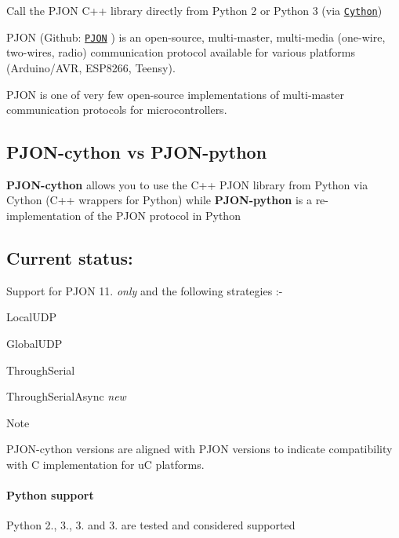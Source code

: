 Call the P\-J\-O\-N C++ library directly from Python 2 or Python 3 (via \href{http://cython.org/}{\tt Cython})

P\-J\-O\-N (Github\-: \href{https://github.com/gioblu/PJON/}{\tt P\-J\-O\-N} ) is an open-\/source, multi-\/master, multi-\/media (one-\/wire, two-\/wires, radio) communication protocol available for various platforms (Arduino/\-A\-V\-R, E\-S\-P8266, Teensy).

P\-J\-O\-N is one of very few open-\/source implementations of multi-\/master communication protocols for microcontrollers.

\subsection*{P\-J\-O\-N-\/cython vs P\-J\-O\-N-\/python}

{\bfseries P\-J\-O\-N-\/cython} allows you to use the C++ P\-J\-O\-N library from Python via Cython (C++ wrappers for Python) while {\bfseries P\-J\-O\-N-\/python} is a re-\/implementation of the P\-J\-O\-N protocol in Python

\subsection*{Current status\-:}

Support for P\-J\-O\-N 11. {\itshape only} and the following strategies \-:-\/
\begin{DoxyItemize}
\item Local\-U\-D\-P
\item Global\-U\-D\-P
\item Through\-Serial
\item Through\-Serial\-Async {\itshape new}
\end{DoxyItemize}

Note


\begin{DoxyItemize}
\item P\-J\-O\-N-\/cython versions are aligned with P\-J\-O\-N versions to indicate compatibility with C implementation for u\-C platforms.
\end{DoxyItemize}

\paragraph*{Python support}

Python 2., 3., 3. and 3. are tested and considered supported

